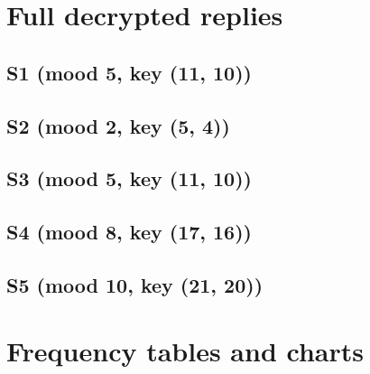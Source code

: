 \documentclass[11pt,a4paper]{article}
\makeatletter
\DeclareRobustCommand{\_}{\textunderscore\allowbreak}  %
\newcommand\rawinput[1]{\@@input #1 }
\makeatother
\begin{document}
\section{Full decrypted replies}
\label{app:plain}

\subsection*{S1 (mood 5, key (11, 10))}
{\small\ttfamily\raggedright }

\subsection*{S2 (mood 2, key (5, 4))}
{\small\ttfamily\raggedright }

\subsection*{S3 (mood 5, key (11, 10))}
{\small\ttfamily\raggedright }

\subsection*{S4 (mood 8, key (17, 16))}
{\small\ttfamily\raggedright }

\subsection*{S5 (mood 10, key (21, 20))}
{\small\ttfamily\raggedright }

\newpage
\section{Frequency tables and charts}
\label{app:freq}

\newcommand{\freqtable}[3]{%
\begin{table}[H]\centering\small
\caption{#1 (mood #2) ranked frequencies, $n = #3$ letters.}
\begin{tabular}{r c r r c r}
\toprule
Rank & Cipher & Count & \% & English & \% \\
\midrule
\rawinput{data/freq_#1.tex}
\bottomrule
\end{tabular}
\end{table}}
\end{document}
